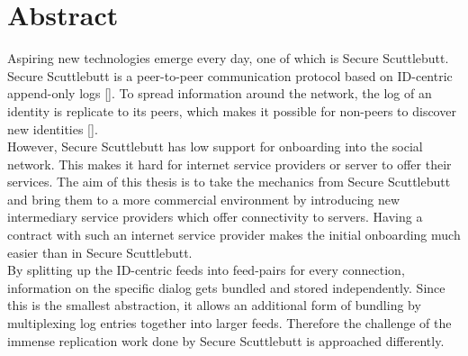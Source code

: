\chapter{Abstract}
Aspiring new technologies emerge every day, one of which is Secure Scuttlebutt. Secure Scuttlebutt is a peer-to-peer communication protocol based on ID-centric append-only logs []. To spread information around the network, the log of an identity is replicate to its peers, which makes it possible for non-peers to discover new identities [].
\\

However, Secure Scuttlebutt has low support for onboarding into the social network. This makes it hard for internet service providers or server to offer their services. The aim of this thesis is to take the mechanics from Secure Scuttlebutt and bring them to a more commercial environment by introducing new intermediary service providers which offer connectivity to servers. Having a contract with such an internet service provider makes the initial onboarding much easier than in Secure Scuttlebutt. 
\\

By splitting up the ID-centric feeds into feed-pairs for every connection, information on the specific dialog gets bundled and stored independently. Since this is the smallest abstraction, it allows an additional form of bundling by multiplexing log entries together into larger feeds. Therefore the challenge of the immense replication work done by Secure Scuttlebutt is approached differently. 

